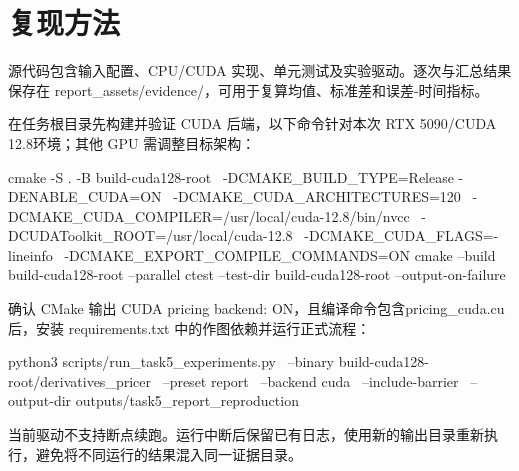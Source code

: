 \documentclass[UTF8,a4paper,zihao=5,fontset=none]{ctexart}
\begin{document}
\appendix

\section{复现方法}

源代码包含输入配置、CPU/CUDA 实现、单元测试及实验驱动。逐次与汇总结果保存在 {\small\ttfamily report\_\allowbreak{}a\allowbreak{}ssets/\allowbreak{}ev\allowbreak{}idence/\allowbreak{}}，可用于复算均值、标准差和误差-时间指标。



在任务根目录先构建并验证 CUDA 后端，以下命令针对本次 RTX 5090/CUDA 12.8环境；其他 GPU 需调整目标架构：


\par{}
\begin{ReportCode}
cmake -S . -B build-cuda128-root \
  -DCMAKE_BUILD_TYPE=Release -DENABLE_CUDA=ON \
  -DCMAKE_CUDA_ARCHITECTURES=120 \
  -DCMAKE_CUDA_COMPILER=/usr/local/cuda-12.8/bin/nvcc \
  -DCUDAToolkit_ROOT=/usr/local/cuda-12.8 \
  -DCMAKE_CUDA_FLAGS=-lineinfo \
  -DCMAKE_EXPORT_COMPILE_COMMANDS=ON
cmake --build build-cuda128-root --parallel
ctest --test-dir build-cuda128-root --output-on-failure
\end{ReportCode}

\needspace{11\baselineskip}

确认 CMake 输出 {\small\ttfamily CUDA pri\allowbreak{}cing bac\allowbreak{}kend: ON\allowbreak{}}，且编译命令包含{\small\ttfamily pricing\_\allowbreak{}cuda.\allowbreak{}cu} 后，安装 {\small\ttfamily requirem\allowbreak{}ents.\allowbreak{}txt\allowbreak{}} 中的作图依赖并运行正式流程：


\par{}
\begin{ReportCode}
python3 scripts/run_task5_experiments.py \
  --binary build-cuda128-root/derivatives_pricer \
  --preset report \
  --backend cuda \
  --include-barrier \
  --output-dir outputs/task5_report_reproduction
\end{ReportCode}

当前驱动不支持断点续跑。运行中断后保留已有日志，使用新的输出目录重新执行，避免将不同运行的结果混入同一证据目录。
\end{document}
